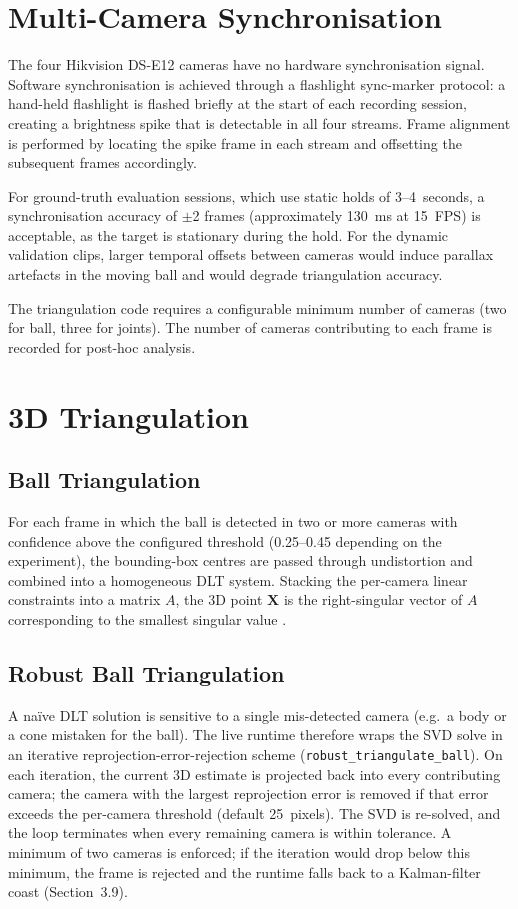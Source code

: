 \section{Multi-Camera Synchronisation}

The four Hikvision DS-E12 cameras have no hardware synchronisation signal. Software synchronisation is achieved through a flashlight sync-marker protocol: a hand-held flashlight is flashed briefly at the start of each recording session, creating a brightness spike that is detectable in all four streams. Frame alignment is performed by locating the spike frame in each stream and offsetting the subsequent frames accordingly.

For ground-truth evaluation sessions, which use static holds of 3--4~seconds, a synchronisation accuracy of $\pm$2 frames (approximately 130~ms at 15~FPS) is acceptable, as the target is stationary during the hold. For the dynamic validation clips, larger temporal offsets between cameras would induce parallax artefacts in the moving ball and would degrade triangulation accuracy.

The triangulation code requires a configurable minimum number of cameras (two for ball, three for joints). The number of cameras contributing to each frame is recorded for post-hoc analysis.

\section{3D Triangulation}

\subsection{Ball Triangulation}

For each frame in which the ball is detected in two or more cameras with confidence above the configured threshold (0.25--0.45 depending on the experiment), the bounding-box centres are passed through undistortion and combined into a homogeneous DLT system. Stacking the per-camera linear constraints into a matrix $A$, the 3D point $\mathbf{X}$ is the right-singular vector of $A$ corresponding to the smallest singular value \cite{ref1}.

\subsection{Robust Ball Triangulation}

A na\"{i}ve DLT solution is sensitive to a single mis-detected camera (e.g.\ a body or a cone mistaken for the ball). The live runtime therefore wraps the SVD solve in an iterative reprojection-error-rejection scheme (\texttt{robust\_triangulate\_ball}). On each iteration, the current 3D estimate is projected back into every contributing camera; the camera with the largest reprojection error is removed if that error exceeds the per-camera threshold (default 25~pixels). The SVD is re-solved, and the loop terminates when every remaining camera is within tolerance. A minimum of two cameras is enforced; if the iteration would drop below this minimum, the frame is rejected and the runtime falls back to a Kalman-filter coast (Section~3.9).

